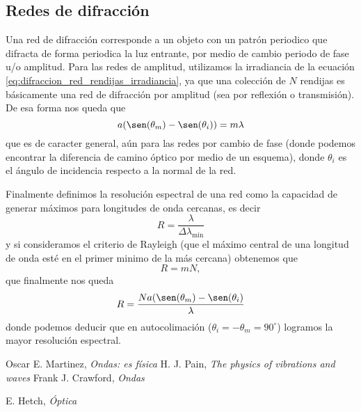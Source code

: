 \documentclass[a4paper]{article}
\numberwithin{equation}{section}
\begin{document}
	\subsection{Redes de difracción}
		Una red de difracción corresponde a un objeto con un patrón periodico que difracta de forma periodica la luz entrante, por medio de cambio periodo de fase u/o amplitud. Para las redes de amplitud, utilizamos la irradiancia de la ecuación \ref{eq:difraccion_red_rendijas_irradiancia}, ya que una colección de $N$ rendijas es básicamente una red de difracción por amplitud (sea por reflexión o transmisión). De esa forma nos queda que
		\begin{equation}
			a (\sen(\theta_m) - \sen(\theta_i)) = m \lambda
			\label{eq:difraccion_red_ecuacion}
		\end{equation}
		que es de caracter general, aún para las redes por cambio de fase (donde podemos encontrar la diferencia de camino óptico por medio de un esquema), donde $\theta_i$ es el ángulo de incidencia respecto a la normal de la red.
		
		Finalmente definimos la resolución espectral de una red como la capacidad de generar máximos para longitudes de onda cercanas, es decir
		\begin{equation}
			R = \frac{\lambda}{\Delta \lambda_{\text{min}}}
			\label{eq:difraccion_red_resolucion_espectral}
		\end{equation}
		y si consideramos el criterio de Rayleigh (que el máximo central de una longitud de onda esté en el primer minimo de la más cercana) obtenemos que \[R = m N,\] que finalmente nos queda
		\begin{equation}
			R = \frac{N a(\sen(\theta_m) - \sen(\theta_i)}{\lambda}
			\label{eq:difraccion_red_resolucion_rayleigh}
		\end{equation}
		donde podemos deducir que en autocolimación ($\theta_i = -\theta_m = 90^\circ$) logramos la mayor resolución espectral.
\begin{thebibliography}{9}
        Oscar E. Martinez, \emph{Ondas: es física}
		H. J. Pain, \emph{The physics of vibrations and waves}
        Frank J. Crawford, \emph{Ondas}

		E. Hetch, \emph{Óptica}
\end{thebibliography}
\end{document}

